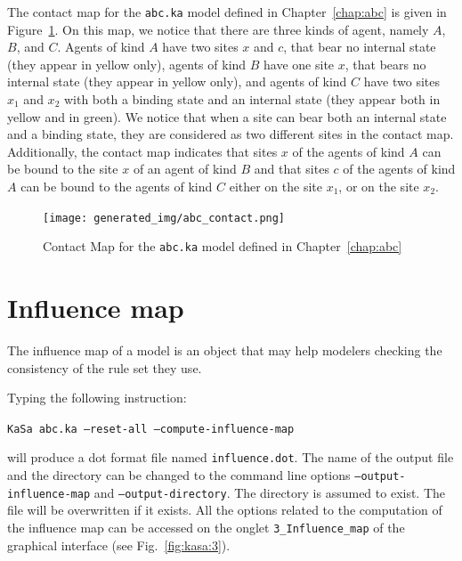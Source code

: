 \documentclass[11pt]{book}
\def\ttt#1{\texttt{#1}}
\begin{document}
The contact map for the \ttt{abc.ka} model  defined in Chapter~\ref{chap:abc} is given in Figure~\ref{fig:abc-contact}. On this map, we notice that there are three kinds of agent, namely $A$, $B$, and $C$. 
Agents of kind $A$ have two sites $x$ and $c$, that bear no internal state (they appear in yellow only), agents of kind $B$ have one site $x$, that bears no internal state (they appear in yellow only), and agents of kind $C$ have two sites $x_1$ and $x_2$ with both a binding state and an internal state (they appear both in yellow and in green). We notice that when a site can bear both an internal state and a binding state, they are considered as two different sites in the contact map. Additionally, the contact map indicates that sites $x$ of the agents of kind $A$ can be bound to the site $x$ of an agent of kind $B$ and that sites $c$ of the agents of kind $A$ can be bound to the agents of kind $C$ either on the site $x_1$, or on the site $x_2$. 

\begin{figure}[htbp]
\centering
\texttt{[image: generated\_img/abc\_contact.png]}
\caption{Contact Map for the \ttt{abc.ka} model defined in Chapter~\ref{chap:abc}}
\label{fig:abc-contact}
\end{figure}



\section{Influence map}

The influence map of a model is an object that may help modelers checking the consistency of the rule set they use. 

Typing the following instruction:

\texttt{KaSa abc.ka --reset-all --compute-influence-map}

will produce a dot format file named \texttt{influence.dot}. 
The name of the output file and the directory can be changed to the command line options \texttt{--output-influence-map} and \texttt{--output-directory}. 
The directory is assumed to exist. The file will be overwritten if it exists.  All the options related to the computation of the influence map can be accessed on the onglet \texttt{3\_Influence\_map} of the graphical interface (see Fig.~\ref{fig:kasa:3}). 
\end{document}
